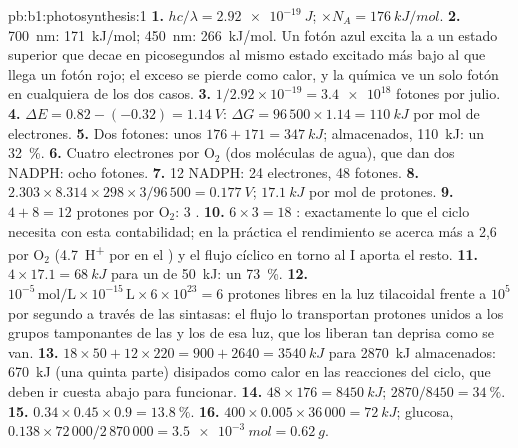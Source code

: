 \begin{solution}{pb:b1:photosynthesis:1}
\textbf{1.} $hc/\lambda = \qty{2.92e-19}{J}$; $\times N_A = \qty{176}{kJ/mol}$.
\textbf{2.} \qty{700}{nm}: \qty{171}{kJ/mol}; \qty{450}{nm}:
\qty{266}{kJ/mol}. Un fotón azul excita la  a un estado superior
que decae en picosegundos al mismo estado excitado más bajo al que llega un
fotón rojo; el exceso se pierde como calor, y la química ve un solo fotón en
cualquiera de los dos casos.
\textbf{3.} $1/2.92\times 10^{-19} = \num{3.4e18}$ fotones por julio.
\textbf{4.} $\Delta E = 0.82 - (-0.32) = \qty{1.14}{V}$: $\Delta G =
96\,500\times 1.14 = \qty{110}{kJ}$ por mol de electrones.
\textbf{5.} Dos fotones: unos $176 + 171 = \qty{347}{kJ}$; almacenados,
\qty{110}{kJ}: un \qty{32}{\%}.
\textbf{6.} Cuatro electrones por $\mathrm{O_2}$ (dos moléculas de agua),
que dan dos NADPH: ocho fotones.
\textbf{7.} 12 NADPH: 24 electrones, 48 fotones.
\textbf{8.} $2.303\times 8.314\times 298\times 3/96\,500 = \qty{0.177}{V}$;
$\qty{17.1}{kJ}$ por mol de protones.
\textbf{9.} $4 + 8 = 12$ protones por $\mathrm{O_2}$: 3 .
\textbf{10.} $6\times 3 = 18$ : exactamente lo que el ciclo necesita con
esta contabilidad; en la práctica el rendimiento se acerca más a 2,6 por
$\mathrm{O_2}$ (\qty{4.7}{H^+} por  en el ) y el flujo cíclico
en torno al  I aporta el resto.
\textbf{11.} $4\times 17.1 = \qty{68}{kJ}$ para un  de \qty{50}{kJ}:
un \qty{73}{\%}.
\textbf{12.} $10^{-5}\,\mathrm{mol/L}\times 10^{-15}\,\mathrm{L}\times
6\times 10^{23} = 6$ protones libres en la luz tilacoidal frente a $10^5$
por segundo a través de las sintasas: el flujo lo transportan protones
unidos a los grupos tamponantes de las  y los  de esa luz,
que los liberan tan deprisa como se van.
\textbf{13.} $18\times 50 + 12\times 220 = 900 + 2640 = \qty{3540}{kJ}$
para \qty{2870}{kJ} almacenados: \qty{670}{kJ} (una quinta parte) disipados
como calor en las reacciones del ciclo, que deben ir cuesta abajo para
funcionar.
\textbf{14.} $48\times 176 = \qty{8450}{kJ}$; $2870/8450 = \qty{34}{\%}$.
\textbf{15.} $0.34\times 0.45\times 0.9 = \qty{13.8}{\%}$.
\textbf{16.} $400\times 0.005\times 36\,000 = \qty{72}{kJ}$; glucosa,
$0.138\times 72\,000/2\,870\,000 = \qty{3.5e-3}{mol} = \qty{0.62}{g}$.

\end{solution}
